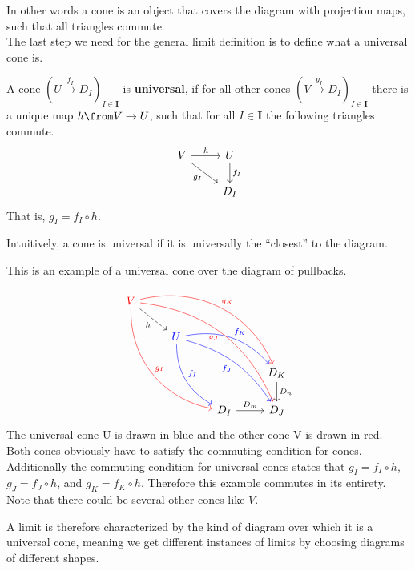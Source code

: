 In other words a cone is an object that covers the diagram with projection maps,
such that all triangles commute.\\
The last step we need for the
general limit definition is
to define what a universal cone is.

\begin{definition}
  A cone $(U \overset{f_I}{\to} D_I)_{I\in \bm{I}}$ is \textbf{universal}, if
  for all other cones $(V \overset{g_I}{\to} D_I)_{I\in \bm{I}}$ there is a unique
  map $h \from V \to U$, such that for all $I \in \bm{I}$
  the following triangles commute.
  \[
    \begin{tikzcd}
      V \arrow[dr, swap, "g_I"] \arrow{r}{h} & U \arrow{d}{f_I} \\
      & D_I
    \end{tikzcd}
  \]
  That is, $g_I = f_I \circ h$.
\end{definition}
Intuitively, a cone is universal if it
is universally the ``closest'' to the diagram.

\begin{example}
  This is an example of a universal cone over the
  diagram of pullbacks.
  \[
    \begin{tikzcd}
      {\color{red}V}
      \arrow[bend right=40,color=red]{dddrr}{g_I}
      \arrow[bend left=40, color=red]{ddrrr}{g_K}
      \arrow[bend left=30, color=red, swap]{dddrrr}{g_J}
      \arrow[dashed,swap]{dr}{h}
      & & & \\
      & {\color{blue}U}
      \arrow[bend right=30,color=blue]{ddr}{f_I}
      \arrow[bend left=30, color=blue]{drr}{f_K}
      \arrow[bend left=20, color=blue, swap]{ddrr}{f_J}&   &\\
      & & & D_K \arrow{d}{D_n} \\
      & & D_I \arrow{r}{D_m} & D_J
    \end{tikzcd}
  \]
  The universal cone {\color{blue}U}
  is drawn in blue and the other cone {\color{red}V} is drawn in red.
  Both cones obviously have to satisfy the commuting condition for cones.
  Additionally the commuting condition for universal cones states that
  $g_I = f_I \circ h$, $g_J = f_J \circ h$, and $g_K = f_K \circ h$.
  Therefore this example commutes in its entirety.\\
  Note that there could be several other cones like $V$.
\end{example}

A limit is therefore characterized by the kind of diagram
over which it is a universal cone, meaning we get different instances of limits
by choosing diagrams of different shapes.

